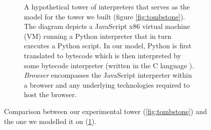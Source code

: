 \documentclass[a4paper,12pt,twoside,openright]{report}
\theoremstyle{definition}
\begin{document}
\begin{figure}[htp!]
\begin{subfigure}[htp!]{\linewidth}
            \caption{A hypothetical tower of interpreters that serves as the model for the tower we built (figure \ref{fig:tombstone}). The diagram depicts a JavaScript x86 virtual machine (VM) running a Python \cite{van2011python} interpreter that in turn executes a Python script. In our model, Python is first translated to bytecode which is then interpreted by some bytecode interpreter (written in the C language \cite{kernighan1988c}). \textit{Browser} encompasses the JavaScript interpreter within a browser and any underlying technologies required to host the browser.}
            \label{fig:tombstone_practical}
    \end{subfigure}
    \caption{Comparison between our experimental tower (\ref{fig:tombstone}) and the one we modelled it on  (\ref{fig:tombstone_practical}).}
    \label{fig:tombstone_all}
\end{figure}
\newpage
\end{document}
